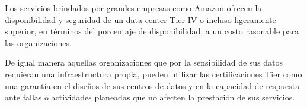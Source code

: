\documentclass[journal]{IEEEtran}
\begin{document}
Los servicios brindados por grandes empresas como Amazon ofrecen la disponibilidad y seguridad de un data center Tier IV o incluso ligeramente superior, en términos del porcentaje de disponibilidad, a un 
costo rasonable para las organizaciones.

De igual manera aquellas organizaciones que por la sensibilidad de sus datos requieran una infraestructura propia, pueden utilizar las certificaciones Tier como una garantía en el diseños
de sus centros de datos y en la capacidad de respuesta ante fallas o actividades planeadas que no afecten la prestación de sus servicios.







\end{document}
